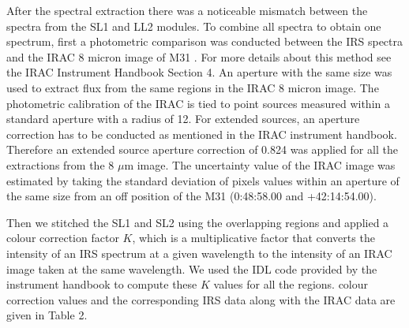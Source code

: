 \documentclass[useAMS,usenatbib,a4paper]{mn2e}
\begin{document}
After the spectral extraction there was a noticeable mismatch between the spectra from the SL1 and LL2 modules. To combine all spectra to obtain one spectrum, first a photometric comparison was conducted between the IRS spectra and the IRAC 8 micron image of M31 \citep{Barmby2006lr}. For more details about this method see the IRAC Instrument Handbook Section 4. An aperture with the same size was used to extract flux from the same regions in the IRAC 8 micron image. The photometric calibration of the IRAC is tied to point sources measured within a standard aperture with a radius of 12\arcsec. For extended sources,  an aperture correction has to be conducted as mentioned in the IRAC instrument handbook. Therefore an extended source aperture correction of 0.824 was applied for all the extractions from the 8 $\mu$m image. The uncertainty value of the IRAC image was estimated by taking the standard deviation of pixels values within an aperture of the same size from an off position of the M31 (0:48:58.00 and +42:14:54.00).

Then we stitched the SL1 and SL2 using the overlapping regions and applied a colour correction factor $K$, which is a multiplicative factor that converts the intensity of an IRS spectrum at a given wavelength to the intensity of an IRAC image taken at the same wavelength. We used the IDL code provided by the instrument handbook to compute these $K$ values for all the regions. colour correction values and the corresponding IRS data along with the IRAC data are given in Table 2.
\end{document}
